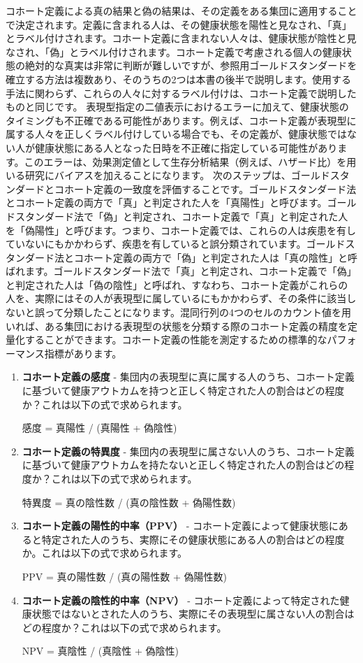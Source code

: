 \documentclass[
  11pt]{book}
\theoremstyle{definition}
\theoremstyle{definition}
\theoremstyle{definition}
\theoremstyle{definition}
\theoremstyle{remark}
\begin{document}
コホート定義による真の結果と偽の結果は、その定義をある集団に適用することで決定されます。定義に含まれる人は、その健康状態を陽性と見なされ、「真」とラベル付けされます。コホート定義に含まれない人々は、健康状態が陰性と見なされ、「偽」とラベル付けされます。コホート定義で考慮される個人の健康状態の絶対的な真実は非常に判断が難しいですが、参照用ゴールドスタンダードを確立する方法は複数あり、そのうちの2つは本書の後半で説明します。使用する手法に関わらず、これらの人々に対するラベル付けは、コホート定義で説明したものと同じです。 表現型指定の二値表示におけるエラーに加えて、健康状態のタイミングも不正確である可能性があります。例えば、コホート定義が表現型に属する人々を正しくラベル付けしている場合でも、その定義が、健康状態ではない人が健康状態にある人となった日時を不正確に指定している可能性があります。このエラーは、効果測定値として生存分析結果（例えば、ハザード比）を用いる研究にバイアスを加えることになります。 次のステップは、ゴールドスタンダードとコホート定義の一致度を評価することです。ゴールドスタンダード法とコホート定義の両方で「真」と判定された人を「真陽性」と呼びます。ゴールドスタンダード法で「偽」と判定され、コホート定義で「真」と判定された人を「偽陽性」と呼びます。つまり、コホート定義では、これらの人は疾患を有していないにもかかわらず、疾患を有していると誤分類されています。ゴールドスタンダード法とコホート定義の両方で「偽」と判定された人は「真の陰性」と呼ばれます。ゴールドスタンダード法で「真」と判定され、コホート定義で「偽」と判定された人は「偽の陰性」と呼ばれ、すなわち、コホート定義がこれらの人を、実際にはその人が表現型に属しているにもかかわらず、その条件に該当しないと誤って分類したことになります。混同行列の4つのセルのカウント値を用いれば、ある集団における表現型の状態を分類する際のコホート定義の精度を定量化することができます。コホート定義の性能を測定するための標準的なパフォーマンス指標があります。

\begin{enumerate}
\def\labelenumi{\arabic{enumi}.}
\item
  \textbf{コホート定義の感度} - 集団内の表現型に真に属する人のうち、コホート定義に基づいて健康アウトカムを持つと正しく特定された人の割合はどの程度か？これは以下の式で求められます。

  感度 = 真陽性 / (真陽性 + 偽陰性)
\item
  \textbf{コホート定義の特異度} - 集団内の表現型に属さない人のうち、コホート定義に基づいて健康アウトカムを持たないと正しく特定された人の割合はどの程度か？これは以下の式で求められます。

  特異度 = 真の陰性数 / (真の陰性数 + 偽陽性数)
\item
  \textbf{コホート定義の陽性的中率（PPV）} - コホート定義によって健康状態にあると特定された人のうち、実際にその健康状態にある人の割合はどの程度か。これは以下の式で求められます。

  PPV = 真の陽性数 / (真の陽性数 + 偽陽性数)
\item
  \textbf{コホート定義の陰性的中率（NPV）} - コホート定義によって特定された健康状態ではないとされた人のうち、実際にその表現型に属さない人の割合はどの程度か？これは以下の式で求められます。

  NPV = 真陰性 / (真陰性 + 偽陰性)
\end{enumerate}
\end{document}
